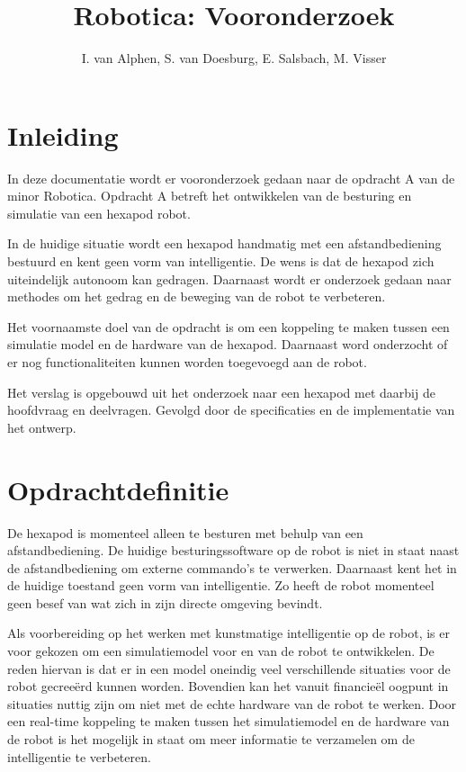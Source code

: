 \documentclass[10pt,a4paper]{article}
\title{Robotica: Vooronderzoek}
\author{I. van Alphen, S. van Doesburg, E.  Salsbach, M. Visser}
\begin{document}
\maketitle
\newpage

\tableofcontents
\newpage

\iffalse %
\section{Samenvatting}
Not in use yet
\newpage
\fi

\section{Inleiding}
In deze documentatie wordt er vooronderzoek gedaan naar de opdracht A van de minor Robotica. Opdracht A betreft het ontwikkelen van de besturing en simulatie van een hexapod robot.\cite{beroepsopdrachten}

In de huidige situatie wordt een hexapod handmatig met een afstandbediening bestuurd en kent geen vorm van intelligentie. De wens is dat de hexapod zich uiteindelijk autonoom kan gedragen. Daarnaast wordt er onderzoek gedaan naar methodes om het gedrag en de beweging van de robot te verbeteren.

Het voornaamste doel van de opdracht is om een koppeling te maken tussen een simulatie model en de hardware van de hexapod. Daarnaast word onderzocht of er nog functionaliteiten kunnen worden toegevoegd aan de robot.

Het verslag is opgebouwd uit het onderzoek naar een hexapod met daarbij de hoofdvraag en deelvragen. Gevolgd door de specificaties en de implementatie van het ontwerp.

\newpage

\section{Opdrachtdefinitie}
De hexapod is momenteel alleen te besturen met behulp van een afstandbediening. De huidige besturingssoftware op de robot is niet in staat naast de afstandbediening om externe commando's te verwerken. Daarnaast kent het in de huidige toestand geen vorm van intelligentie. Zo heeft de robot momenteel geen besef van wat zich in zijn directe omgeving bevindt.

Als voorbereiding op het werken met kunstmatige intelligentie op de robot, is er voor gekozen om een simulatiemodel voor en van de robot te ontwikkelen. De reden hiervan is dat er in een model oneindig veel verschillende situaties voor de robot gecree\"erd kunnen worden. Bovendien kan het vanuit financie\"el oogpunt in situaties nuttig zijn om niet met de echte hardware van de robot te werken. 
Door een real-time koppeling te maken tussen het simulatiemodel en de hardware van de robot is het mogelijk in staat om meer informatie te verzamelen om de intelligentie te verbeteren.
\end{document}
